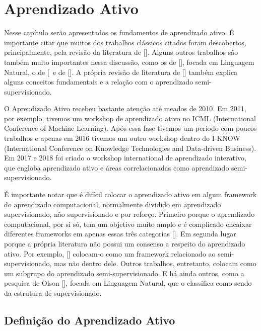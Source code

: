 \chapter{Aprendizado Ativo}
\label{cap:aprendizado_ativo}

Nesse capítulo serão apresentados os fundamentos de aprendizado ativo. É importante citar que muitos dos trabalhos clássicos citados foram descobertos, principalmente, pela revisão da literatura de [\cite{settles2012active, settles2014active}]. Alguns outros trabalhos são também muito importantes nessa discussão, como os de [\cite{olsson2009literature}], focada em Linguagem Natural, o de [\cite{aggarwal2014active}\ e de [\cite{wang2011active}]. A própria revisão de literatura de [\cite{zhu2006semi}] também explica alguns conceitos fundamentais e a relação com o aprendizado semi-supervisionado.

O Aprendizado Ativo recebeu bastante atenção até meados de 2010. Em 2011, por exemplo, tivemos um workshop de aprendizado ativo no ICML (International Conference of Machine Learning). Após essa fase tivemos um período com poucos trabalhos e apenas em 2016 tivemos um outro workshop dentro do I-KNOW (International Conference on Knowledge Technologies and Data-driven Business). Em 2017 e 2018 foi criado o workshop international de aprendizado interativo, que engloba aprendizado ativo e áreas correlacionadas como aprendizado semi-supervisionado.

É importante notar que é difícil colocar o aprendizado ativo em algum framework do aprendizado computacional, normalmente dividido em aprendizado supervisionado, não supervisionado  e por reforço. Primeiro porque o aprendizado computacional, por si só, tem um objetivo muito amplo e é complicado encaixar diferentes frameworks em apenas essas três categorias [\cite{abu2012learning}]. Em segunda lugar porque a própria literatura não possui um consenso a respeito do aprendizado ativo. Por exemplo, [\cite{settles2012active, zhu2006semi}] colocam-o como um framework relacionado ao semi-supervisionado, mas não dentro dele. Outros trabalhos, entretanto, colocam como um subgrupo do aprendizado semi-supervisionado. E há ainda outros, como a pesquisa de Olson [\cite{olsson2009literature}], focada em Linguagem Natural, que o classifica como sendo da estrutura de supervisionado. 

\section{Definição do Aprendizado Ativo}
\label{sec:definicao}

